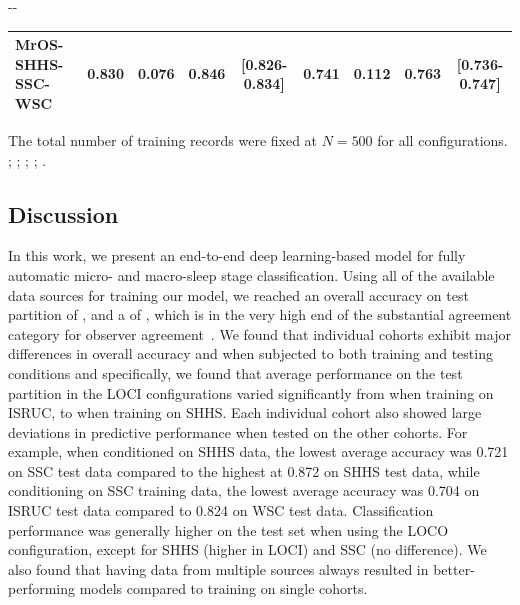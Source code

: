 \begin{table}
\begin{adjustwidth*}{}{-\marginparwidth-\marginparsep}
\begin{threeparttable}
\begin{tabular}{@{}lcccccccc@{}}
\acs{MrOS}-\acs{SHHS}-\acs{SSC}-\acs{WSC}         & 0.830         & 0.076       & 0.846           & [0.826-0.834]         & 0.741         & 0.112       & 0.763           & [0.736-0.747]         \\ \bottomrule
\end{tabular}
\begin{tablenotes}
\small \item The total number of training records were fixed at \(N=500\) for all configurations. %
; %
; %
; %
; %
.
\end{tablenotes}
\end{threeparttable}
\end{adjustwidth*}
\end{table}

\subsection{Discussion}
In this work, we present an end-to-end deep learning-based model for fully automatic micro- and macro-sleep stage classification. 
Using all of the available data sources for training our model, we reached an overall accuracy on test partition of , and a \cohen of , which is in the very high end of the substantial agreement category for observer agreement~\cite{Landis1977}.
We found that individual cohorts exhibit major differences in overall accuracy and \cohen when subjected to both training and testing conditions and specifically, we found that average performance on the test partition in the \ac{LOCI} configurations varied significantly from  when training on \ac{ISRUC}, to  when training on \ac{SHHS}.
Each individual cohort also showed large deviations in predictive performance when tested on the other cohorts.
For example, when conditioned on \ac{SHHS} data, the lowest average accuracy was 0.721 on \ac{SSC} test data compared to the highest at 0.872 on \ac{SHHS} test data, while conditioning on \ac{SSC} training data, the lowest average accuracy was 0.704 on \ac{ISRUC} test data compared to 0.824 on \ac{WSC} test data.
Classification performance was generally higher on the test set when using the \ac{LOCO} configuration, except for \ac{SHHS} (higher in \ac{LOCI}) and \ac{SSC} (no difference).
We also found that having data from multiple sources always resulted in better-performing models compared to training on single cohorts.

